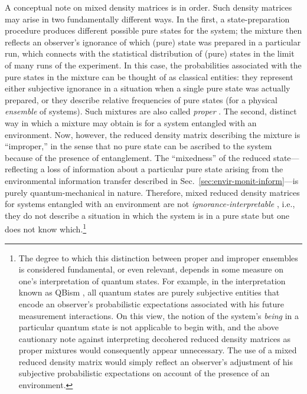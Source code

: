 \documentclass[3p,sort&compress]{elsarticle}
\begin{document}
A conceptual note on mixed density matrices is in order. Such density matrices may arise in two fundamentally different ways. In the first, a state-preparation procedure produces different possible pure states for the system; the mixture then reflects an observer's ignorance of which (pure) state was prepared in a particular run, which connects with the statistical distribution of (pure) states in the limit of many runs of the experiment. In this case, the probabilities associated with the pure states in the mixture can be thought of as classical entities: they represent either subjective ignorance in a situation when a single pure state was actually prepared, or they describe relative frequencies of pure states (for a physical \emph{ensemble} of systems). Such mixtures are also called \emph{proper} \cite{Espagnat:1966:mf,Espagnat:1988:cf,Espagnat:1995:ma,Schlosshauer:2003:tv,Schlosshauer:2007:un}. The second, distinct way in which a mixture may obtain is for a system entangled with an environment. Now, however, the reduced density matrix describing the mixture is ``improper,'' in the sense that no pure state can be ascribed to the system because of the presence of entanglement. The ``mixedness'' of the reduced state---reflecting a loss of information about a particular pure state arising from the environmental information transfer described in Sec.~\ref{sec:envir-monit-inform}---is purely quantum-mechanical in nature. Therefore, mixed reduced density matrices for systems entangled with an environment are not \emph{ignorance-interpretable} \cite{Espagnat:1966:mf,Espagnat:1988:cf,Espagnat:1995:ma,Schlosshauer:2003:tv,Schlosshauer:2007:un}, i.e., they do not describe a situation in which the system is in a pure state but one does not know which.\footnote{The degree to which this distinction between proper and improper ensembles is considered fundamental, or even relevant, depends in some measure on one's interpretation of quantum states. For example, in the interpretation known as QBism \cite{Fuchs:2014:pp}, all quantum states are purely subjective entities that encode an observer's probabilistic expectations associated with his future measurement interactions. On this view, the notion of the system's \emph{being} in a particular quantum state is not applicable to begin with, and the above cautionary note against interpreting decohered reduced density matrices as proper mixtures would consequently appear unnecessary. The use of a mixed reduced density matrix would simply reflect an observer's adjustment of his subjective probabilistic expectations on account of the presence of an environment.}
\end{document}
